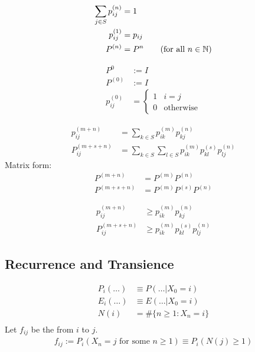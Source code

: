 \documentclass[11pt]{article}
\newcommand{\ur}[2]{{#1}^{({#2})}}
\newcommand{\dur}[3]{{#1}_{#2}^{({#3})}}
\begin{document}
    \fact
    \begin{align*}
    	\sum_{j\in S} \dur{p}{ij}{n} &= 1 \\
    	\dur{p}{ij}{1} &= p_{ij} \\
    	\ur{P}{n} &= P^n \tag{for all $n \in \mb{N}$}
    \end{align*}
    
    \notation
    \begin{align*}
    	 P^0 &:= I \\
    	 \ur{P}{0} &:= I \\
    	 \dur{p}{ij}{0} &= \begin{cases}
    	 	1 & i = j\\
    	 	0 & \text{otherwise}
    	 \end{cases}
    \end{align*}
    
    

    
    \begin{align*}
    	p_{ij}^{(m+n)} &= \sum_{k \in S} p_{ik}^{(m)}p_{kj}^{(n)} \\
    	P_{ij}^{(m + s +n)} &= \sum_{k \in S}\sum_{l \in S} p_{ik}^{(m)} p_{kl}^{(s)}p_{lj}^{(n)}
    \end{align*}
    Matrix form:
	\begin{align*}
		P^{(m + n)} &= P^{(m)}P^{(n)} \\
		P^{(m + s +n)} &= P^{(m)}P^{(s)}P^{(n)}
	\end{align*}
    
    \begin{align*}
    	p_{ij}^{(m+n)} &\geq p_{ik}^{(m)}p_{kj}^{(n)} \tag{for all $k \in S$} \\
    	P_{ij}^{(m + s +n)} &\geq  p_{ik}^{(m)} p_{kl}^{(s)}p_{lj}^{(n)} \tag{for any $k, l \in S$}
    \end{align*}
    
    \subsection{Recurrence and Transience}
    \notation
    \begin{align*}
    	P_i(\hdots) &\equiv P(\hdots | X_0 = i) \\
    	E_i(\hdots) &\equiv E(\hdots | X_0 = i) \\
    	N(i) &= \#\{n \geq 1: X_n = i\} \tag{total number of times that the chain hits $i$, not counting time 0} \\
    \end{align*}
    Let $f_{ij}$ be the  from $i$ to $j$.
    \begin{align*}
    	 f_{ij} := P_i(X_n = j \text{ for some } n \geq 1) \equiv P_i(N(j) \geq 1)
    \end{align*}
    
\end{document}
